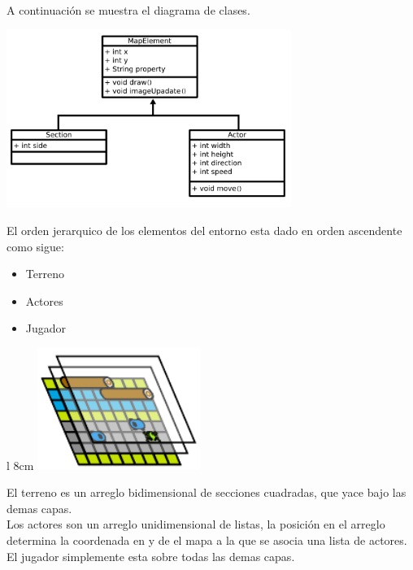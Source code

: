 \documentclass[letter, 12pt] {article}
\begin{document}
A continuación se muestra el diagrama de clases.
\begin {center}  %
  \includegraphics[width=350px]{./img/MapElements-UML.pdf}\\[1cm]
\end {center}

El orden jerarquico de los elementos del entorno esta dado 
en orden ascendente como sigue:

\begin {itemize}
  \item Terreno
  \item Actores
  \item Jugador
\end {itemize}

\begin {wrapfigure} {l} {8cm}
  \includegraphics[width=200px]{./img/layer-model.pdf}\\[.5cm]
\end {wrapfigure}

El terreno es un arreglo bidimensional de secciones cuadradas, que
yace bajo las demas capas.\\

Los actores son un arreglo unidimensional de listas, la posición
en el arreglo determina la coordenada en y de el mapa a la que se 
asocia una lista de actores.\\

El jugador simplemente esta sobre todas las demas capas.\\
\end{document}

